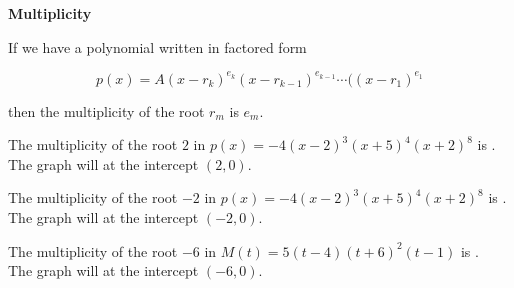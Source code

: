 \documentclass{ximera}
\author{Lee Wayand}
\begin{document}
\begin{exercise}






\begin{idea} \textbf{\textcolor{blue!55!black}{Multiplicity}}


If we have a polynomial written in factored form

\[
p(x) = A (x-r_k)^{e_k} (x-r_{k-1})^{e_{k-1}}  \cdots ((x-r_1)^{e_1}
\]

then the multiplicity of the root $r_m$ is $e_m$. \\





\end{idea}



\begin{question}


The multiplicity of the root $2$ in $p(x) = -4 (x - 2)^3 (x + 5)^4 (x + 2)^8$ is . \\



The graph will  at the intercept $(2, 0)$.

\end{question}





\begin{question}


The multiplicity of the root $-2$ in $p(x) = -4 (x - 2)^3 (x + 5)^4 (x + 2)^8$ is . \\



The graph will  at the intercept $(-2, 0)$.

\end{question}





\begin{question}


The multiplicity of the root $-6$ in $M(t) = 5(t - 4) (t + 6)^2 (t - 1)$ is . \\



The graph will  at the intercept $(-6, 0)$.




\end{question}
\end{exercise}
\end{document}
